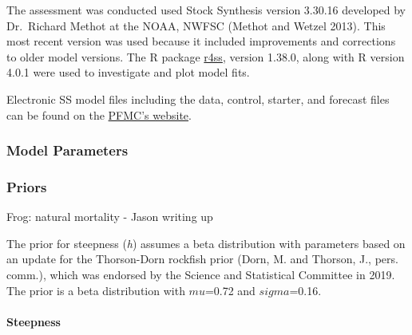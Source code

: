 \documentclass[11pt,
  english,
  a4paper,
]{article}
\begin{document}
The assessment was conducted used Stock Synthesis version 3.30.16 developed by Dr.~Richard Methot at the NOAA, NWFSC {(Methot and Wetzel 2013)\leavevmode\tagmcend\tagstructend}. This most recent version was used because it included improvements and corrections to older model versions. The R package {\href{https://github.com/r4ss/r4ss}{r4ss}\leavevmode\tagmcend\tagstructend}, version 1.38.0, along with R version 4.0.1 were used to investigate and plot model fits.

Electronic SS model files including the data, control, starter, and forecast files can be found on the {\href{https://www.pcouncil.org/groundfish/stock-assessments/}{PFMC's website}\leavevmode\tagmcend\tagstructend}.


\hypertarget{model-parameters}{%
\subsubsection{Model Parameters}\label{model-parameters}}

\leavevmode\tagmcend\tagstructend


\hypertarget{priors}{%
\subsubsection{Priors}\label{priors}}

\leavevmode\tagmcend\tagstructend

Frog: natural mortality - Jason writing up

The prior for steepness (\emph{h}) assumes a beta distribution with parameters based on an update for the Thorson-Dorn rockfish prior (Dorn, M. and Thorson, J., pers. comm.), which was endorsed by the Science and Statistical Committee in 2019. The prior is a beta distribution with {\(mu\)\leavevmode\tagmcend\tagstructend}=0.72 and {\(sigma\)\leavevmode\tagmcend\tagstructend}=0.16.


\hypertarget{steepness}{%
\paragraph{Steepness}\label{steepness}}
\end{document}
